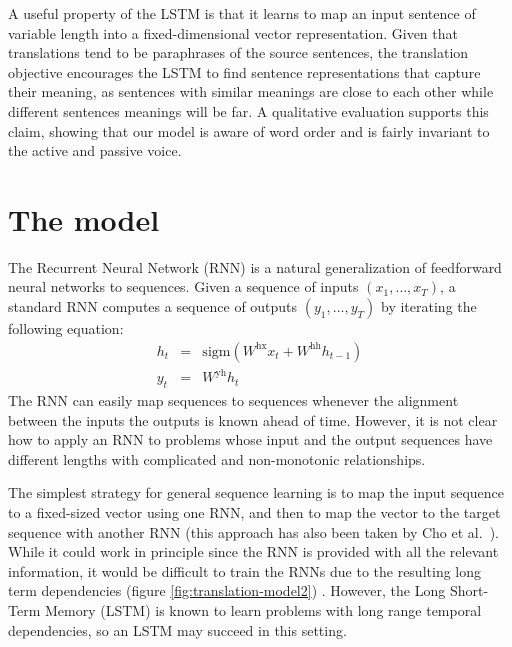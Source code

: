 \documentclass{article}
\begin{document}
A useful property of the LSTM is that it learns to map an input
sentence of variable length into a fixed-dimensional vector
representation.  Given that translations tend to be paraphrases of the
source sentences, the translation objective encourages the LSTM to
find sentence representations that capture their meaning, as sentences
with similar meanings are close to each other while different
sentences meanings will be far. A qualitative evaluation supports
this claim, showing that our model is aware of word order and is
fairly invariant to the active and passive voice.

\section{The model}
\label{sec:model}

The Recurrent Neural Network (RNN) \cite{werbos,rumelhart1986learning}
is a natural generalization of feedforward neural networks to
sequences.  Given a sequence of inputs $(x_1,\ldots,x_T)$, a
standard RNN computes a sequence of outputs $(y_1,\ldots,y_T)$ by
iterating the following equation: 
\begin{eqnarray*}
h_t &=& \mathrm{sigm}\left(W^{\mathrm{hx}} x_t + W^{\mathrm{hh}} h_{t-1}\right) \\
y_t &=& W^{\mathrm{yh}}h_t
\end{eqnarray*}
The RNN can easily map sequences to sequences whenever the alignment
between the inputs the outputs is known ahead of time. However, it is
not clear how to apply an RNN to problems whose input and the output
sequences have different lengths with complicated and non-monotonic
relationships.

The simplest strategy for general sequence learning is to map the input
sequence to a fixed-sized vector using one RNN, and then to map the
vector to the target sequence with another RNN (this approach has also been
taken by Cho et al.~\cite{cho14}).  While it could work
in principle since the RNN is provided with all the relevant
information, it would be difficult to train the RNNs due to the
resulting long term dependencies
(figure \ref{fig:translation-model2})
\cite{hochreiter_long_term,bengio_long_term,hochreiter97,Hochreiter01gradientflow}. However, the Long
Short-Term Memory (LSTM) \cite{hochreiter97} is known to learn
problems with long range temporal dependencies, so an LSTM may succeed
in this setting.
\end{document}
